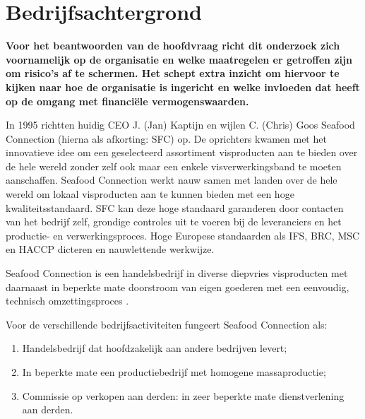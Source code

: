 
\chapter{Bedrijfsachtergrond}
\label{hoofd:bedrijfsachtergrond}
\textbf{Voor het beantwoorden van de hoofdvraag richt dit onderzoek zich voornamelijk op de organisatie en welke maatregelen er getroffen zijn om risico's af te schermen. Het schept extra inzicht om hiervoor te kijken naar hoe de organisatie is ingericht en welke invloeden dat heeft op de omgang met financiële vermogenswaarden.}

\medskip
\noindent
In 1995 richtten huidig CEO J. (Jan) Kaptijn en wijlen C. (Chris) Goos Seafood Connection (hierna als afkorting: SFC) op. De oprichters kwamen met het innovatieve idee om een geselecteerd assortiment visproducten aan te bieden over de hele wereld zonder zelf ook maar een enkele visverwerkingsband te moeten aanschaffen. Seafood Connection werkt nauw samen met landen over de hele wereld om lokaal visproducten aan te kunnen bieden met een hoge kwaliteitsstandaard. SFC kan deze hoge standaard garanderen door contacten van het bedrijf zelf, grondige controles uit te voeren bij de leveranciers en het productie- en verwerkingsproces. Hoge Europese standaarden als IFS, BRC, MSC en HACCP dicteren en nauwlettende werkwijze. \citep{sfcreglement}

Seafood Connection is een handelsbedrijf in diverse diepvries visproducten met daarnaast in beperkte mate doorstroom van eigen goederen met een eenvoudig, technisch omzettingsproces \citep{aoibsfc}. 


\vfill
\begin{center}
\end{center}

\newpage
\noindent
Voor de verschillende bedrijfsactiviteiten fungeert Seafood Connection als:

\begin{enumerate}
    \item Handelsbedrijf dat hoofdzakelijk aan andere bedrijven levert;
    \item In beperkte mate een productiebedrijf met homogene massaproductie;
    \item Commissie op verkopen aan derden: in zeer beperkte mate dienstverlening aan derden.
\end{enumerate}

